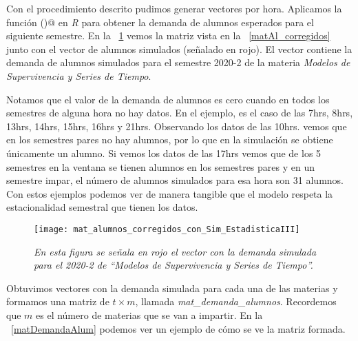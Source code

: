 Con el procedimiento descrito pudimos generar vectores por hora. Aplicamos la función \verb@hw()@ en \textit{R} para obtener la demanda de alumnos esperados para el siguiente semestre. En la \figurename{~\ref{matAl_corregidos_y_sim}} vemos la matriz vista en la \figurename{~\ref{matAl_corregidos}} junto con el vector de alumnos simulados (señalado en rojo). El vector contiene la demanda de alumnos simulados para el semestre 2020-2 de la materia \textit{Modelos de Supervivencia y Series de Tiempo}.

Notamos que el valor de la demanda de alumnos es cero cuando en todos los semestres de alguna hora no hay datos. En el ejemplo, es el caso de las 7hrs, 8hrs, 13hrs, 14hrs, 15hrs, 16hrs y 21hrs. Observando los datos de las 10hrs. vemos que en los semestres pares no hay alumnos, por lo que en la simulación se obtiene únicamente un alumno. Si vemos los datos de las 17hrs vemos que de los 5 semestres en la ventana se tienen alumnos en los semestres pares y en un semestre impar, el número de alumnos simulados para esa hora son 31 alumnos. Con estos ejemplos podemos ver de manera tangible que el modelo respeta la estacionalidad semestral que tienen los datos.

\begin{figure}[H]
\centering
\texttt{[image: mat\_alumnos\_corregidos\_con\_Sim\_EstadisticaIII]} %
\caption[\textit{Ejemplo de vector con demanda simulada para el 2020-2 de ``Modelos de Supervivencia y Series de Tiempo''}]{\textit{En esta figura se señala en rojo el vector con la demanda simulada para el 2020-2 de ``Modelos de Supervivencia y Series de Tiempo''.}}\label{matAl_corregidos_y_sim}
\end{figure}


Obtuvimos vectores con la demanda simulada para cada una de las materias y formamos una matriz de $t \times m$, llamada \textit{mat\_demanda\_alumnos}. Recordemos que $m$ es el número de materias que se van a impartir. En la \figurename{~\ref{matDemandaAlum}} podemos ver un ejemplo de cómo se ve la matriz formada.

